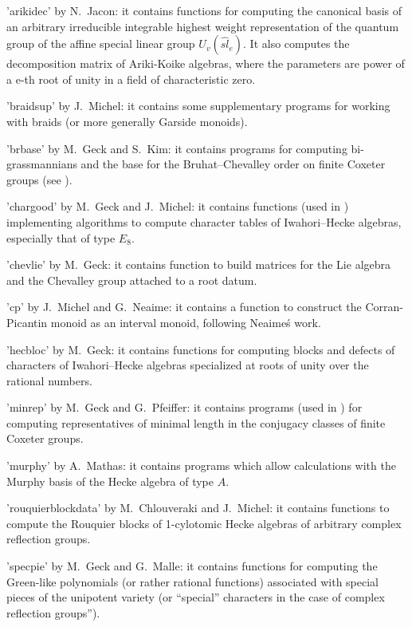 'arikidec'  by N.~Jacon: it contains  functions for computing the canonical
basis  of an arbitrary irreducible integrable highest weight representation
of   the  quantum   group  of   the  affine   special  linear   group  $U_v
(\widehat{sl}_e)$. It also computes the decomposition matrix of Ariki-Koike
algebras, where the parameters are power of a e-th root of unity in a field
of characteristic zero.

'braidsup'  by  J.~Michel:  it  contains  some  supplementary  programs for
working with braids (or more generally Garside monoids).

'brbase'  by  M.~Geck  and  S.~Kim:  it  contains  programs  for  computing
bi-grassmannians  and the  base for  the Bruhat--Chevalley  order on finite
Coxeter groups (see \cite{GK96}).

'chargood'  by  M.~Geck  and  J.~Michel:  it  contains  functions  (used in
\cite{GM97})   implementing  algorithms  to  compute  character  tables  of
Iwahori--Hecke algebras, especially that of type $E_8$.

'chevlie' by M.~Geck: it contains function to build matrices for the Lie
algebra and the Chevalley group attached to a root datum.

'cp'  by J.~Michel and  G.~Neaime: it contains  a function to construct the
Corran-Picantin monoid as an interval monoid, following Neaime\'s work.

'hecbloc'  by  M.~Geck:  it  contains  functions  for  computing blocks and
defects  of characters of  Iwahori--Hecke algebras specialized  at roots of
unity over the rational numbers.

'minrep'  by  M.~Geck  and  G.~Pfeiffer:  it  contains  programs  (used  in
\cite{GP93})  for  computing  representatives  of  minimal  length  in  the
conjugacy classes of finite Coxeter groups.

'murphy'  by A.~Mathas: it contains  programs which allow calculations with
the Murphy basis of the Hecke algebra of type $A$.

'rouquierblockdata'  by M.~Chlouveraki and J.~Michel: it contains functions
to  compute the Rouquier blocks of  1-cylotomic Hecke algebras of arbitrary
complex reflection groups.

'specpie'  by M.~Geck and G.~Malle: it contains functions for computing the
Green-like  polynomials  (or  rather  rational  functions)  associated with
special  pieces of the unipotent variety  (or ``special'' characters in the
case of complex reflection groups'').

